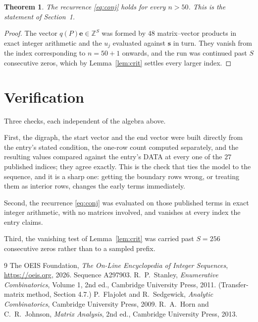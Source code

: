 \documentclass[11pt,a4paper]{article}
\theoremstyle{plain}
\newtheorem{theorem}{Theorem}
\theoremstyle{definition}
\begin{document}
\begin{theorem}
The recurrence \eqref{eq:conj} holds for every $n>50$. This is the statement of
Section~1.
\end{theorem}

\begin{proof}
The vector $q(P)\mathbf{e}\in\mathbb{Z}^{S}$ was formed by $48$ matrix--vector
products in exact integer arithmetic and the $u_j$ evaluated against $\mathbf{s}$ in turn.
They vanish from the index corresponding to $n=50+1$ onwards, and the run was continued
past $S$ consecutive zeros, which by Lemma~\ref{lem:crit} settles every larger index.
\end{proof}

\section{Verification}

Three checks, each independent of the algebra above.

First, the digraph, the start vector and the end vector were built directly from the
entry's stated condition, the one-row count computed separately, and the resulting values
compared against the entry's DATA at every one of the $27$ published indices; they
agree exactly. This is the check that ties the model to the sequence, and it is a sharp one:
getting the boundary rows wrong, or treating them as interior rows, changes the early terms
immediately.

Second, the recurrence \eqref{eq:conj} was evaluated on those published terms in exact
integer arithmetic, with no matrices involved, and vanishes at every index the entry claims.

Third, the vanishing test of Lemma~\ref{lem:crit} was carried past $S=256$ consecutive
zeros rather than to a sampled prefix.

\begin{thebibliography}{9}
 The OEIS Foundation, \emph{The On-Line Encyclopedia of Integer
Sequences}, \url{https://oeis.org}, 2026. Sequence A297903.
 R.~P.~Stanley, \emph{Enumerative Combinatorics}, Volume 1, 2nd ed.,
Cambridge University Press, 2011. (Transfer-matrix method, Section 4.7.)
 P.~Flajolet and R.~Sedgewick, \emph{Analytic Combinatorics}, Cambridge
University Press, 2009.
 R.~A.~Horn and C.~R.~Johnson, \emph{Matrix Analysis}, 2nd ed., Cambridge
University Press, 2013.
\end{thebibliography}
\end{document}
